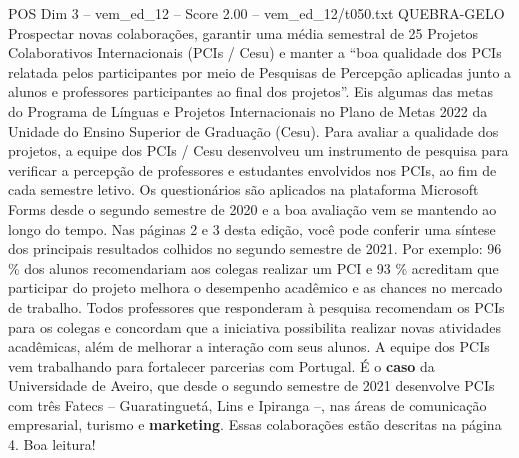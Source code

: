 \begin{textsample}{POS Dim 3 – vem\_ed\_12 – Score 2.00 – vem\_ed\_12/t050.txt}  \label{ex:f3_pos_162}
QUEBRA-GELO Prospectar novas colaborações, garantir uma média semestral de 25 Projetos Colaborativos Internacionais (PCIs / Cesu) e manter a “boa qualidade dos PCIs relatada pelos participantes por meio de Pesquisas de Percepção aplicadas junto a alunos e professores participantes ao final dos projetos”.
Eis algumas das metas do Programa de Línguas e Projetos Internacionais no Plano de Metas 2022 da Unidade do Ensino Superior de Graduação (Cesu).
Para avaliar a qualidade dos projetos, a equipe dos PCIs / Cesu desenvolveu um instrumento de pesquisa para verificar a percepção de professores e estudantes envolvidos nos PCIs, ao fim de cada semestre letivo.
Os questionários são aplicados na plataforma Microsoft Forms desde o segundo semestre de 2020 e a boa avaliação vem se mantendo ao longo do tempo.
Nas páginas 2 e 3 desta edição, você pode conferir uma síntese dos principais resultados colhidos no segundo semestre de 2021.
Por exemplo: 96 \% dos alunos recomendariam aos colegas realizar um PCI e 93 \% acreditam que participar do projeto melhora o desempenho acadêmico e as chances no mercado de trabalho.
Todos professores que responderam à pesquisa recomendam os PCIs para os colegas e concordam que a iniciativa possibilita realizar novas atividades acadêmicas, além de melhorar a interação com seus alunos.
A equipe dos PCIs vem trabalhando para fortalecer parcerias com Portugal.
É o \textbf{caso} da Universidade de Aveiro, que desde o segundo semestre de 2021 desenvolve PCIs com três Fatecs – Guaratinguetá, Lins e Ipiranga –, nas áreas de comunicação empresarial, turismo e \textbf{marketing}.
Essas colaborações estão descritas na página 4.
Boa leitura!

\end{textsample}
